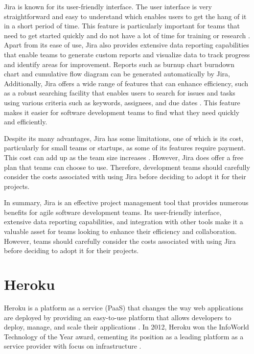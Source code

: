 Jira is known for its user-friendly interface. The user interface is very straightforward and easy to understand which enables users to get the hang of it in a short period of time. This feature is particularly important for teams that need to get started quickly and do not have a lot of time for training or research \cite{patrick1}. Apart from its ease of use, Jira also provides extensive data reporting capabilities that enable teams to generate custom reports and visualize data to track progress and identify areas for improvement. Reports such as burnup chart burndown chart and cumulative flow diagram can be generated automatically by Jira,  Additionally, Jira offers a wide range of features that can enhance efficiency, such as a robust searching facility that enables users to search for issues and tasks using various criteria  such as keywords, assignees, and due dates \cite{patrick1, ravis}. This feature makes it easier for software development teams to find what they need quickly and efficiently. 

Despite its many advantages, Jira has some limitations, one of which is its cost, particularly for small teams or startups, as some of its features require payment. This cost can add up as the team size increases \cite{ravis}. However, Jira does offer a free plan that teams can choose to use. Therefore, development teams should carefully consider the costs associated with using Jira before deciding to adopt it for their projects.

In summary, Jira is an effective project management tool that provides numerous benefits for agile software development teams. Its user-friendly interface, extensive data reporting capabilities, and integration with other tools make it a valuable asset for teams looking to enhance their efficiency and collaboration. However, teams should carefully consider the costs associated with using Jira before deciding to adopt it for their projects.

\section{Heroku}
Heroku is a platform as a service (PaaS) that changes the way web applications are deployed by providing an easy-to-use platform that allows developers to deploy, manage, and scale their applications \cite{mike}. In 2012, Heroku won the InfoWorld Technology of the Year award, cementing its position as a leading platform as a service provider with focus on infrastructure \cite{greengard, news}.

